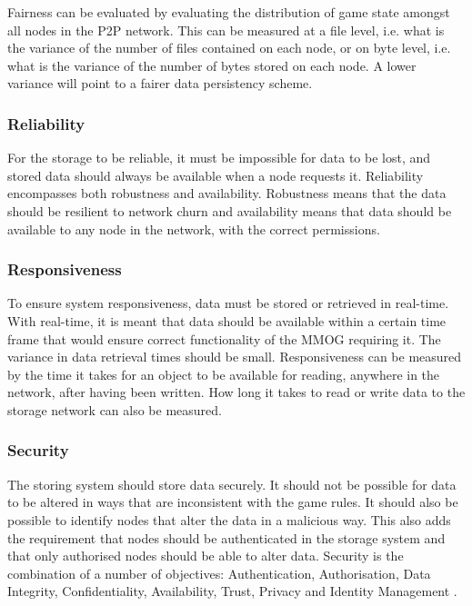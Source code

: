 \documentclass[10pt,a4paper,journal,cspaper,compsoc]{IEEEtran}
\begin{document}
Fairness can be evaluated by evaluating the distribution of game state amongst all nodes in the P2P network. This can be measured at a file level,
i.e. what is the variance of the number of files contained on each node, or on byte level, i.e. what is the variance of the number of bytes stored on
each node. A lower variance will point to a fairer data persistency scheme.

\subsubsection{Reliability}

For the storage to be reliable, it must be impossible for data to be lost, and stored data should always be available when a node requests it.
Reliability encompasses both robustness and availability. Robustness means that the data should be resilient to network churn and availability means
that data should be available to any node in the network, with the correct permissions.

\subsubsection{Responsiveness}

To ensure system responsiveness, data must be stored or retrieved in real-time. With real-time, it is meant that data should be available within a
certain time frame that would ensure correct functionality of the MMOG requiring it. The variance in data retrieval times should be small.
Responsiveness can be measured by the time it takes for an object to be available for reading, anywhere in the network, after having been written.
How long it takes to read or write data to the storage network can also be measured.

\subsubsection{Security}
\label{characteristics_security}

The storing system should store data securely. It should not be possible for data to be altered in ways that are inconsistent with the game rules. It
should also be possible to identify nodes that alter the data in a malicious way. This also adds the requirement that nodes should be authenticated
in the storage system and that only authorised nodes should be able to alter data. Security is the combination of a number of objectives:
Authentication, Authorisation, Data Integrity, Confidentiality, Availability, Trust, Privacy and Identity Management
\cite{distributed_systems_security}.
\end{document}
